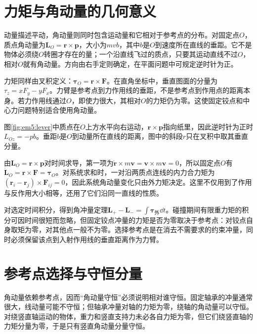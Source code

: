 \section{力矩与角动量的几何意义}

动量描述平动，角动量则同时包含运动量和它相对于参考点的分布。对固定点$O$，质点角动量为$\bm L_O=\bm r\times\bm p$，大小为$mvb$，其中$b$是$O$到速度所在直线的垂距。它不是物体必须绕$O$转圈才存在的量；一个沿直线飞过的质点，只要其运动直线不过$O$，相对$O$就有角动量。方向由右手定则确定，在平面问题中可规定逆时针为正。

力矩同样由叉积定义：$\bm\tau_O=\bm r\times\bm F$。在直角坐标中，垂直图面的分量为$\tau_z=xF_y-yF_x$。力臂是参考点到力作用线的垂距，不是参考点到作用点的距离本身。若力作用线通过$O$，即使力很大，其相对$O$的力矩仍为零。这使固定铰点和中心力问题特别适合使用角动量。


图\ref{fig:em5:lever}中质点在$O$上方水平向右运动，$\bm r\times\bm p$指向纸里，因此逆时针为正时$L_{Oz}=-pb$。垂距$b$是$O$到动量所在直线的距离，图中的斜段$r$只在叉积中取其垂直分量。

由$\bm L_O=\bm r\times\bm p$对时间求导，第一项为$\dot{\bm r}\times m\bm v=\bm v\times m\bm v=0$，所以固定点$O$有$\dot{\bm L}_O=\bm r\times\bm F=\bm\tau_O$。对系统求和时，一对沿两质点连线的内力合力矩为$(\bm r_i-\bm r_j)\times\bm F_{ij}=0$，因此系统角动量变化只由外力矩决定。这里不仅用到了作用与反作用大小相等，还用了它们沿同一直线的性质。

对选定时间积分，得到角冲量定理$\bm L_+-\bm L_-=\int\bm\tau_{\text{外}}\dd t$。碰撞期间有限重力矩的积分可因时间很短而忽略，但固定铰点冲量的力矩是否为零取决于参考点：对铰点自身取矩为零，对其他点一般不为零。选择参考点是在消去不需要求的约束冲量，同时必须保留该点到入射作用线的垂直距离作为力臂。

\section{参考点选择与守恒分量}

角动量依赖参考点，因而“角动量守恒”必须说明相对谁守恒。固定轴承的冲量通常很大，线动量可能不守恒；但轴承冲量对轴的力矩为零，绕轴的角动量可以守恒。对绕竖直轴运动的物体，重力和竖直支持力未必各自力矩为零，但它们绕竖直轴的力矩分量为零，于是只有竖直角动量分量守恒。

